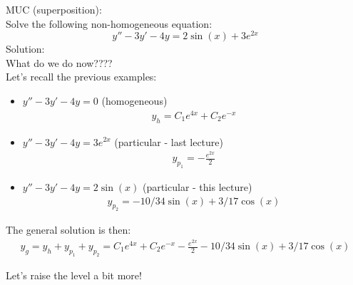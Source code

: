 \begin{exmp}{MUC (superposition):}\\
Solve the following non-homogeneous equation:
\begin{equation*}
y''-3y'-4y=2\sin(x)+3e^{2x}
\end{equation*}
Solution:\\
What do we do now????\\
Let's recall the previous examples:
\begin{itemize}
\item $y''-3y'-4y=0$ (homogeneous)
\begin{align*}
y_h=C_1 e^{4x}+C_2 e^{-x}
\end{align*}
\item $y''-3y'-4y=3e^{2x}$ (particular - last lecture)
\begin{align*}
y_{p_1}=- \frac{e^{2x}}{2}
\end{align*}
\item $y''-3y'-4y=2\sin(x)$ (particular - this lecture)
\begin{align*}
y_{p_2}=-10/34\sin(x)+3/17\cos(x)
\end{align*}
\end{itemize}
The general solution is then:
\begin{align*}
y_g=y_h+y_{p_1}+y_{p_2}=C_1 e^{4x}+C_2 e^{-x} - \frac{e^{2x}}{2}-10/34\sin(x)+3/17\cos(x)
\end{align*}
\end{exmp}

Let's raise the level a bit more!

